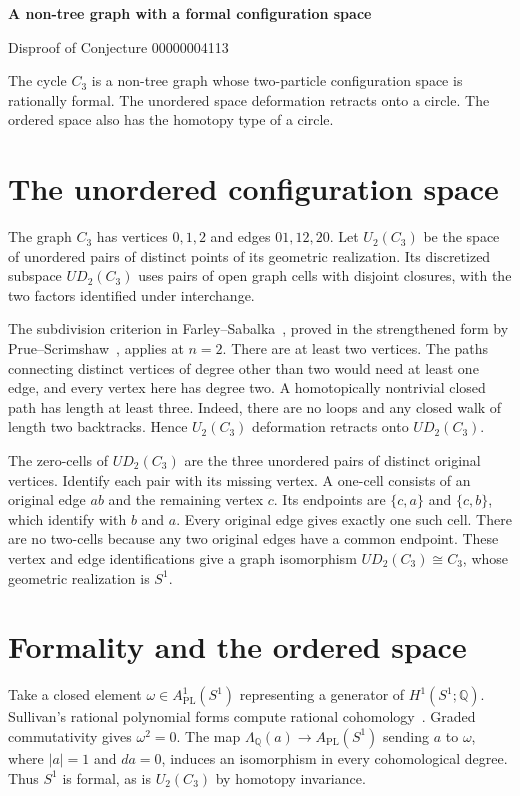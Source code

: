 \documentclass[10pt]{article}
\begin{document}
\begin{center}
  {\Large\bfseries A non-tree graph with a formal configuration space\par}
  \smallskip
  Disproof of Conjecture 00000004113
\end{center}

\noindent
The cycle $C_3$ is a non-tree graph whose two-particle configuration
space is rationally formal. The unordered space deformation retracts
onto a circle. The ordered space also has the homotopy type of a circle.

\section*{The unordered configuration space}

The graph $C_3$ has vertices $0,1,2$ and edges $01,12,20$. Let $U_2(C_3)$
be the space of unordered pairs of distinct points of its geometric
realization. Its discretized subspace $UD_2(C_3)$ uses pairs of open graph
cells with disjoint closures, with the two factors identified under
interchange.

The subdivision criterion in Farley--Sabalka~\cite[Theorem~3.1]{fs},
proved in the strengthened form by Prue--Scrimshaw~\cite[Theorem~3.2]{ps},
applies at $n=2$. There are at least two vertices. The paths connecting
distinct vertices of degree other than two would need at least one edge,
and every vertex here has degree two. A homotopically nontrivial closed
path has length at least three. Indeed, there are no loops and any
closed walk of length two backtracks. Hence $U_2(C_3)$ deformation
retracts onto $UD_2(C_3)$.

The zero-cells of $UD_2(C_3)$ are the three unordered pairs of distinct
original vertices. Identify each pair with its missing vertex. A one-cell
consists of an original edge $ab$ and the remaining vertex $c$. Its
endpoints are $\{c,a\}$ and $\{c,b\}$, which identify with $b$ and $a$.
Every original edge gives exactly one such cell. There are no two-cells
because any two original edges have a common endpoint. These vertex and
edge identifications give a graph isomorphism $UD_2(C_3)\cong C_3$, whose
geometric realization is $S^1$.

\section*{Formality and the ordered space}

Take a closed element $\omega\in A_{\mathrm{PL}}^1(S^1)$ representing a
generator of $H^1(S^1;\mathbb Q)$. Sullivan's rational polynomial forms
compute rational cohomology~\cite{fh}. Graded commutativity gives
$\omega^2=0$. The map $\Lambda_{\mathbb Q}(a)\to A_{\mathrm{PL}}(S^1)$
sending $a$ to $\omega$, where $|a|=1$ and $da=0$, induces an isomorphism
in every cohomological degree. Thus $S^1$ is formal, as is $U_2(C_3)$ by
homotopy invariance.
\end{document}
